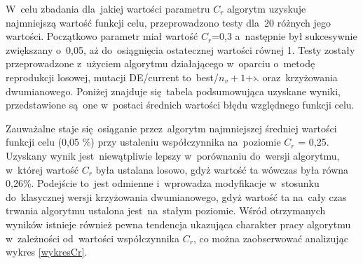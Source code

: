 \begin{itemize}
W~celu zbadania dla~jakiej wartości parametru $C_{r}$ algorytm uzyskuje najmniejszą wartość funkcji celu, przeprowadzono testy dla~20 różnych jego wartości. Początkowo parametr miał wartość $C_{r}$=0,3 a~następnie był sukcesywnie zwiększany o~0,05, aż do~osiągnięcia ostatecznej wartości równej 1. Testy zostały przeprowadzone z~użyciem algorytmu działającego w~oparciu o~metodę reprodukcji losowej, mutacji DE/current to~best/$n_{v}+1$+$\leftthreetimes$ oraz~krzyżowania dwumianowego. Poniżej znajduje się~tabela podsumowująca uzyskane wyniki, przedstawione są~one w~postaci średnich wartości błędu względnego funkcji celu.
\begin{table}[h!]
\begin{center}
\caption{Wartości średniego błędu względnego funkcji celu dla algorytmu ze zmiennym parametrem $C_{r}$ w zakresie (0,1).}
\label{parametrCrzmiennny}
\end{center}
\end{table}

Zauważalne staje się~osiąganie przez~algorytm najmniejszej średniej wartości funkcji celu (0,05 \%) przy ustaleniu współczynnika na~poziomie $C_{r}$ = 0,25. Uzyskany wynik jest~niewątpliwie lepszy w~porównaniu do~wersji algorytmu, w~której wartość $C_{r}$ była ustalana losowo, gdyż wartość ta wówczas była równa 0,26\%. Podejście to~jest odmienne i~wprowadza modyfikacje w~stosunku do~klasycznej wersji krzyżowania dwumianowego, gdyż wartość ta na~cały czas trwania algorytmu ustalona jest~na~stałym poziomie. Wśród otrzymanych wyników istnieje również pewna tendencja ukazująca charakter pracy algorytmu w~zależności od~wartości współczynnika $C_{r}$, co można zaobserwować analizując wykres \ref{wykresCr}.


\end{itemize}
